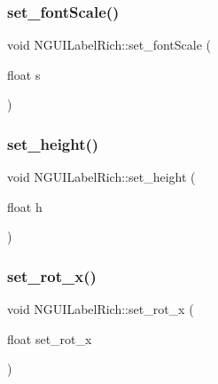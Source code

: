 \subsubsection{\texorpdfstring{set\+\_\+font\+Scale()}{set\_fontScale()}}
{\footnotesize\ttfamily void N\+G\+U\+I\+Label\+Rich\+::set\+\_\+font\+Scale (\begin{DoxyParamCaption}\item[{float}]{s }\end{DoxyParamCaption})}

\hypertarget{class_n_g_u_i_label_rich_a8cdd8283855b9fe3491054314bb7c277}{}\label{class_n_g_u_i_label_rich_a8cdd8283855b9fe3491054314bb7c277} 
\subsubsection{\texorpdfstring{set\+\_\+height()}{set\_height()}}
{\footnotesize\ttfamily void N\+G\+U\+I\+Label\+Rich\+::set\+\_\+height (\begin{DoxyParamCaption}\item[{float}]{h }\end{DoxyParamCaption})}

\hypertarget{class_n_g_u_i_label_rich_a17adb4585089bb8a1470a162ec3c450d}{}\label{class_n_g_u_i_label_rich_a17adb4585089bb8a1470a162ec3c450d} 
\subsubsection{\texorpdfstring{set\+\_\+rot\+\_\+x()}{set\_rot\_x()}}
{\footnotesize\ttfamily void N\+G\+U\+I\+Label\+Rich\+::set\+\_\+rot\+\_\+x (\begin{DoxyParamCaption}\item[{float}]{set\+\_\+rot\+\_\+x }\end{DoxyParamCaption})}

\hypertarget{class_n_g_u_i_label_rich_a6fe07905a0e108cb2ee586fb511c15ca}{}\label{class_n_g_u_i_label_rich_a6fe07905a0e108cb2ee586fb511c15ca} 
